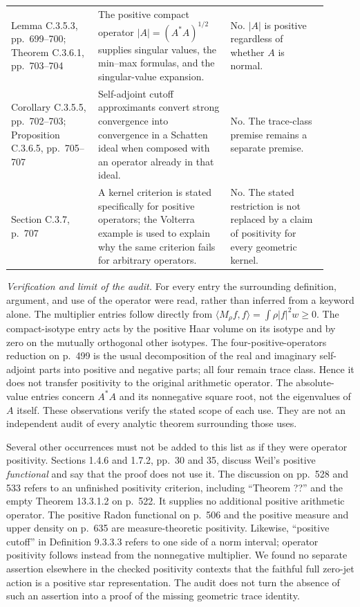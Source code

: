 \begin{longtable}{p{0.25\linewidth}p{0.38\linewidth}p{0.28\linewidth}}
Lemma C.3.5.3, pp.~699--700; Theorem C.3.6.1, pp.~703--704 &
The positive compact operator $|A|=(A^*A)^{1/2}$ supplies
singular values, the min--max formulas, and the singular-value
expansion.
& No. $|A|$ is positive regardless of whether $A$ is normal.\\[3pt]
Corollary C.3.5.5, pp.~702--703; Proposition C.3.6.5,
pp.~705--707 & Self-adjoint cutoff approximants convert strong
convergence into convergence in a Schatten ideal when composed
with an operator already in that ideal.
& No. The trace-class premise remains a separate premise.\\[3pt]
Section C.3.7, p.~707 & A kernel criterion is stated specifically
for positive operators; the Volterra example is used to explain
why the same criterion fails for arbitrary operators.
& No. The stated restriction is not replaced by a claim of
positivity for every geometric kernel.\\
\hline
\end{longtable}

\emph{Verification and limit of the audit.}
For every entry the surrounding definition, argument, and use of
the operator were read, rather than inferred from a keyword alone.
The multiplier entries follow directly from
$\langle M_\rho f,f\rangle=\int\rho|f|^2w\ge0$.
The compact-isotype entry acts by the positive Haar volume on its
isotype and by zero on the mutually orthogonal other isotypes.
The four-positive-operators reduction on p.~499 is the usual
decomposition of the real and imaginary self-adjoint parts into
positive and negative parts; all four remain trace class. Hence
it does not transfer positivity to the original arithmetic operator.
The absolute-value entries concern $A^*A$ and its nonnegative
square root, not the eigenvalues of $A$ itself. These observations
verify the stated scope of each use. They are not an independent
audit of every analytic theorem surrounding those uses.

Several other occurrences must not be added to this list as if
they were operator positivity. Sections 1.4.6 and 1.7.2,
pp.~30 and 35, discuss Weil's positive \emph{functional} and say
that the proof does not use it. The discussion on pp.~528 and
533 refers to an unfinished positivity criterion, including
``Theorem ??'' and the empty Theorem 13.3.1.2 on p.~522.
It supplies no additional positive arithmetic operator. The
positive Radon functional on p.~506 and the positive measure and
upper density on p.~635 are measure-theoretic positivity.
Likewise, ``positive cutoff'' in Definition 9.3.3.3 refers to
one side of a norm interval; operator positivity follows instead
from the nonnegative multiplier. We found no separate assertion
elsewhere in the checked positivity contexts that the faithful
full zero-jet action is a positive star representation. The audit
does not turn the absence of such an assertion into a proof of
the missing geometric trace identity.

